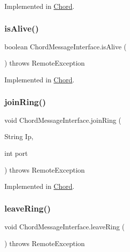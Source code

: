 Implemented in \hyperlink{class_chord_a3f1aadce3820e808c80662bb61a58e34}{Chord}.

\hypertarget{interface_chord_message_interface_a8165b3fb53905e657c70b66223197561}{}\label{interface_chord_message_interface_a8165b3fb53905e657c70b66223197561} 
\subsubsection{\texorpdfstring{is\+Alive()}{isAlive()}}
{\footnotesize\ttfamily boolean Chord\+Message\+Interface.\+is\+Alive (\begin{DoxyParamCaption}{ }\end{DoxyParamCaption}) throws Remote\+Exception}



Implemented in \hyperlink{class_chord_a0a677ced19cc0cb5afd2a695977aeb95}{Chord}.

\hypertarget{interface_chord_message_interface_abc5a9483416a6b8ae7330b324869e236}{}\label{interface_chord_message_interface_abc5a9483416a6b8ae7330b324869e236} 
\subsubsection{\texorpdfstring{join\+Ring()}{joinRing()}}
{\footnotesize\ttfamily void Chord\+Message\+Interface.\+join\+Ring (\begin{DoxyParamCaption}\item[{String}]{Ip,  }\item[{int}]{port }\end{DoxyParamCaption}) throws Remote\+Exception}



Implemented in \hyperlink{class_chord_ace0b8d2768590d7527af155c6573cae7}{Chord}.

\hypertarget{interface_chord_message_interface_a6afa0f7ae38d68a936a85216fe33d5ae}{}\label{interface_chord_message_interface_a6afa0f7ae38d68a936a85216fe33d5ae} 
\subsubsection{\texorpdfstring{leave\+Ring()}{leaveRing()}}
{\footnotesize\ttfamily void Chord\+Message\+Interface.\+leave\+Ring (\begin{DoxyParamCaption}{ }\end{DoxyParamCaption}) throws Remote\+Exception}



